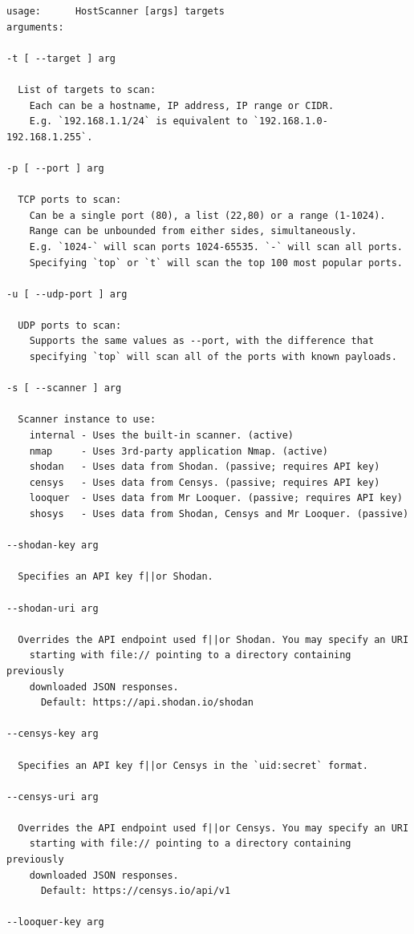 \documentclass[a4paper,12pt]{article}
\begin{document}
	\begin{verbatim}
usage:		HostScanner [args] targets
arguments:

-t [ --target ] arg

  List of targets to scan:
    Each can be a hostname, IP address, IP range or CIDR.
    E.g. `192.168.1.1/24` is equivalent to `192.168.1.0-192.168.1.255`.

-p [ --port ] arg

  TCP ports to scan:
    Can be a single port (80), a list (22,80) or a range (1-1024).
    Range can be unbounded from either sides, simultaneously.
    E.g. `1024-` will scan ports 1024-65535. `-` will scan all ports.
    Specifying `top` or `t` will scan the top 100 most popular ports.

-u [ --udp-port ] arg

  UDP ports to scan:
    Supports the same values as --port, with the difference that
    specifying `top` will scan all of the ports with known payloads.

-s [ --scanner ] arg

  Scanner instance to use:
    internal - Uses the built-in scanner. (active)
    nmap     - Uses 3rd-party application Nmap. (active)
    shodan   - Uses data from Shodan. (passive; requires API key)
    censys   - Uses data from Censys. (passive; requires API key)
    looquer  - Uses data from Mr Looquer. (passive; requires API key)
    shosys   - Uses data from Shodan, Censys and Mr Looquer. (passive)

--shodan-key arg

  Specifies an API key f||or Shodan.

--shodan-uri arg

  Overrides the API endpoint used f||or Shodan. You may specify an URI
    starting with file:// pointing to a directory containing previously
    downloaded JSON responses.
      Default: https://api.shodan.io/shodan

--censys-key arg

  Specifies an API key f||or Censys in the `uid:secret` format.

--censys-uri arg

  Overrides the API endpoint used f||or Censys. You may specify an URI
    starting with file:// pointing to a directory containing previously
    downloaded JSON responses.
      Default: https://censys.io/api/v1

--looquer-key arg


\end{verbatim}
\end{document}
